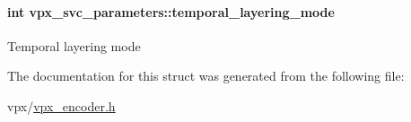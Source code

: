 \paragraph[{\texorpdfstring{temporal\+\_\+layering\+\_\+mode}{temporal_layering_mode}}]{\setlength{\rightskip}{0pt plus 5cm}int vpx\+\_\+svc\+\_\+parameters\+::temporal\+\_\+layering\+\_\+mode}\hypertarget{structvpx__svc__parameters_adf8ca5b4011bf6c0d6248bafc4177190}{}\label{structvpx__svc__parameters_adf8ca5b4011bf6c0d6248bafc4177190}
Temporal layering mode 

The documentation for this struct was generated from the following file\+:\begin{DoxyCompactItemize}
\item 
vpx/\hyperlink{vpx__encoder_8h}{vpx\+\_\+encoder.\+h}\end{DoxyCompactItemize}
